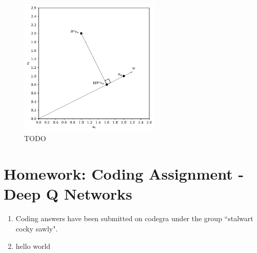 \documentclass{article}
\begin{document}
\begin{enumerate}
	      \begin{figure}[ht!]
		      \centering
		      \includegraphics[width=0.6\textwidth]{images/7.4.4.pdf}
		      \caption{TODO}
		      \label{fig:7.4.4}
	      \end{figure}

\end{enumerate}
\section*{Homework: Coding Assignment - Deep Q Networks}
\begin{enumerate}
	\item Coding answers have been submitted on codegra under the group ``stalwart cocky sawly".
	\item hello world
\end{enumerate}
\end{document}
